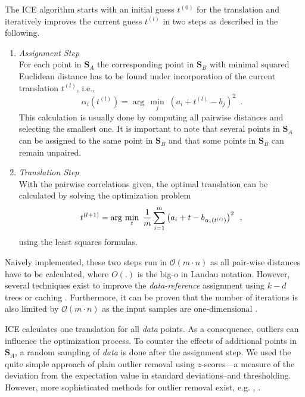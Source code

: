 \documentclass[conference]{IEEEtran}
\theoremstyle{examplestyle}
\begin{document}
The \ac{ICE} algorithm starts with an initial guess $t^{(0)}$ for the translation and iteratively improves the current guess $t^{(l)}$ in two steps as described in the following.

\begin{enumerate}
 \item \emph{Assignment Step}\\
For each point in \(\pmb{S}_A\) the corresponding point in \(\pmb{S}_B\) with minimal squared Euclidean distance has to be found under incorporation of the current translation $t^{(l)}$, i.e., 
\begin{equation}
\alpha_i(t^{(l)})= \arg\,\min\limits_j \; (a_i+t^{(l)}-b_j)^2 \enspace .
\end{equation}
This calculation is usually done by computing all pairwise distances and selecting the smallest one. It is important to note that several points in \(\pmb{S}_A\) can be assigned to the same point in \(\pmb{S}_B\) and that some points in \(\pmb{S}_B\) can remain unpaired.



\item \emph{Translation Step}\\
With the pairwise correlations given, the optimal translation can be calculated by solving the optimization problem
\begin{equation}
t^{(l+1)}= \arg\,\min\limits_{t} \; \dfrac{1}{m} \sum_{i = 1}^{m} \left( a_i + t - b_{\alpha_i(t^{(l)})} \right)^2 \enspace , \\
\end{equation}
using the least squares formulas.
 
\end{enumerate}




Naively implemented, these two steps run in \(\mathcal{O}(m \cdot n)\) as all pair-wise distances have to be calculated, where $O(.)$ is the big-o in Landau notation. However, several techniques exist to improve the \textit{data-reference} assignment using \(k-d\) trees or caching \cite{Pomerleau2015}. Furthermore, it can be proven that the number of iterations is also limited by \(\mathcal{O}(m \cdot n)\) as the input samples are one-dimensional \cite{Ezra2008}.

\ac{ICE} calculates one translation for all \textit{data} points. As a consequence, outliers can influence the optimization process. To counter the effects of additional points in \(\pmb{S}_A\), a random sampling of \textit{data} is done after the assignment step. We used the quite simple approach of plain outlier removal using \(z\)-scores---a measure of the deviation from the expectation value in standard deviations--and thresholding.
However, more sophisticated methods for outlier removal exist, e.g. \cite{Hontani2012}, \cite{Phillips2007}.
\end{document}
